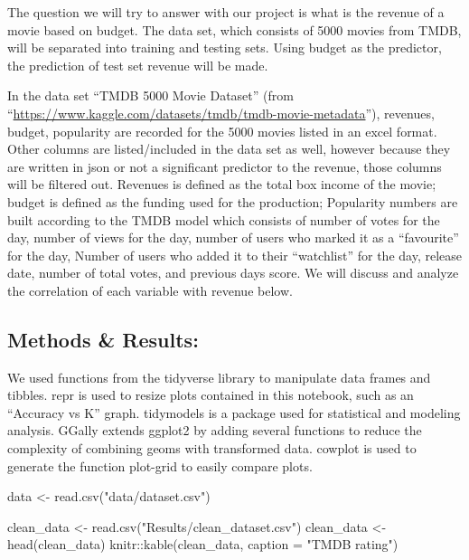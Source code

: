 \documentclass[
]{article}
\newenvironment{Shaded}{\begin{snugshade}}{\end{snugshade}}
\newcommand{\AttributeTok}[1]{\textcolor[rgb]{0.77,0.63,0.00}{#1}}
\newcommand{\FunctionTok}[1]{\textcolor[rgb]{0.00,0.00,0.00}{#1}}
\newcommand{\NormalTok}[1]{#1}
\newcommand{\OtherTok}[1]{\textcolor[rgb]{0.56,0.35,0.01}{#1}}
\newcommand{\SpecialCharTok}[1]{\textcolor[rgb]{0.00,0.00,0.00}{#1}}
\newcommand{\StringTok}[1]{\textcolor[rgb]{0.31,0.60,0.02}{#1}}
\begin{document}
The question we will try to answer with our project is what is the revenue of a movie based on budget. The data set, which consists of 5000 movies from TMDB, will be separated into training and testing sets. Using budget as the predictor, the prediction of test set revenue will be made.

In the data set ``TMDB 5000 Movie Dataset'' (from ``\url{https://www.kaggle.com/datasets/tmdb/tmdb-movie-metadata}''), revenues, budget, popularity are recorded for the 5000 movies listed in an excel format. Other columns are listed/included in the data set as well, however because they are written in json or not a significant predictor to the revenue, those columns will be filtered out. Revenues is defined as the total box income of the movie; budget is defined as the funding used for the production; Popularity numbers are built according to the TMDB model which consists of number of votes for the day, number of views for the day, number of users who marked it as a ``favourite'' for the day, Number of users who added it to their ``watchlist'' for the day, release date, number of total votes, and previous days score. We will discuss and analyze the correlation of each variable with revenue below.

\hypertarget{methods-results}{%
\subsection{Methods \& Results:}\label{methods-results}}

We used functions from the tidyverse library to manipulate data frames and tibbles. repr is used to resize plots contained in this notebook, such as an ``Accuracy vs K'' graph. tidymodels is a package used for statistical and modeling analysis. GGally extends ggplot2 by adding several functions to reduce the complexity of combining geoms with transformed data. cowplot is used to generate the function plot-grid to easily compare plots.

\begin{Shaded}
\begin{Highlighting}[]
\NormalTok{data }\OtherTok{\textless{}{-}} \FunctionTok{read.csv}\NormalTok{(}\StringTok{"data/dataset.csv"}\NormalTok{)}
\end{Highlighting}
\end{Shaded}

\begin{Shaded}
\begin{Highlighting}[]
\NormalTok{clean\_data }\OtherTok{\textless{}{-}} \FunctionTok{read.csv}\NormalTok{(}\StringTok{"Results/clean\_dataset.csv"}\NormalTok{)}
\NormalTok{clean\_data }\OtherTok{\textless{}{-}} \FunctionTok{head}\NormalTok{(clean\_data)}
\NormalTok{knitr}\SpecialCharTok{::}\FunctionTok{kable}\NormalTok{(clean\_data, }\AttributeTok{caption =} \StringTok{"TMDB rating"}\NormalTok{)}
\end{Highlighting}
\end{Shaded}
\end{document}
